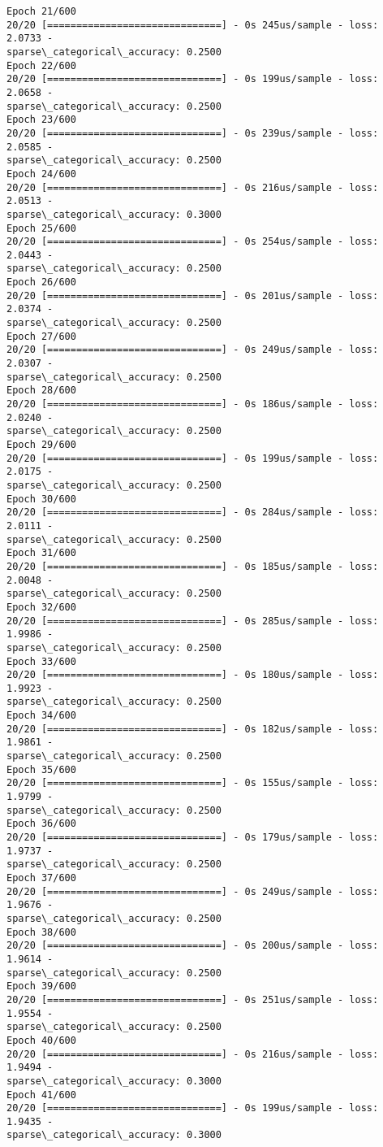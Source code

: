 \documentclass[11pt]{article}
\begin{document}
\begin{Verbatim}[commandchars=\\\{\}]
Epoch 21/600
20/20 [==============================] - 0s 245us/sample - loss: 2.0733 -
sparse\_categorical\_accuracy: 0.2500
Epoch 22/600
20/20 [==============================] - 0s 199us/sample - loss: 2.0658 -
sparse\_categorical\_accuracy: 0.2500
Epoch 23/600
20/20 [==============================] - 0s 239us/sample - loss: 2.0585 -
sparse\_categorical\_accuracy: 0.2500
Epoch 24/600
20/20 [==============================] - 0s 216us/sample - loss: 2.0513 -
sparse\_categorical\_accuracy: 0.3000
Epoch 25/600
20/20 [==============================] - 0s 254us/sample - loss: 2.0443 -
sparse\_categorical\_accuracy: 0.2500
Epoch 26/600
20/20 [==============================] - 0s 201us/sample - loss: 2.0374 -
sparse\_categorical\_accuracy: 0.2500
Epoch 27/600
20/20 [==============================] - 0s 249us/sample - loss: 2.0307 -
sparse\_categorical\_accuracy: 0.2500
Epoch 28/600
20/20 [==============================] - 0s 186us/sample - loss: 2.0240 -
sparse\_categorical\_accuracy: 0.2500
Epoch 29/600
20/20 [==============================] - 0s 199us/sample - loss: 2.0175 -
sparse\_categorical\_accuracy: 0.2500
Epoch 30/600
20/20 [==============================] - 0s 284us/sample - loss: 2.0111 -
sparse\_categorical\_accuracy: 0.2500
Epoch 31/600
20/20 [==============================] - 0s 185us/sample - loss: 2.0048 -
sparse\_categorical\_accuracy: 0.2500
Epoch 32/600
20/20 [==============================] - 0s 285us/sample - loss: 1.9986 -
sparse\_categorical\_accuracy: 0.2500
Epoch 33/600
20/20 [==============================] - 0s 180us/sample - loss: 1.9923 -
sparse\_categorical\_accuracy: 0.2500
Epoch 34/600
20/20 [==============================] - 0s 182us/sample - loss: 1.9861 -
sparse\_categorical\_accuracy: 0.2500
Epoch 35/600
20/20 [==============================] - 0s 155us/sample - loss: 1.9799 -
sparse\_categorical\_accuracy: 0.2500
Epoch 36/600
20/20 [==============================] - 0s 179us/sample - loss: 1.9737 -
sparse\_categorical\_accuracy: 0.2500
Epoch 37/600
20/20 [==============================] - 0s 249us/sample - loss: 1.9676 -
sparse\_categorical\_accuracy: 0.2500
Epoch 38/600
20/20 [==============================] - 0s 200us/sample - loss: 1.9614 -
sparse\_categorical\_accuracy: 0.2500
Epoch 39/600
20/20 [==============================] - 0s 251us/sample - loss: 1.9554 -
sparse\_categorical\_accuracy: 0.2500
Epoch 40/600
20/20 [==============================] - 0s 216us/sample - loss: 1.9494 -
sparse\_categorical\_accuracy: 0.3000
Epoch 41/600
20/20 [==============================] - 0s 199us/sample - loss: 1.9435 -
sparse\_categorical\_accuracy: 0.3000

\end{Verbatim}
\end{document}
